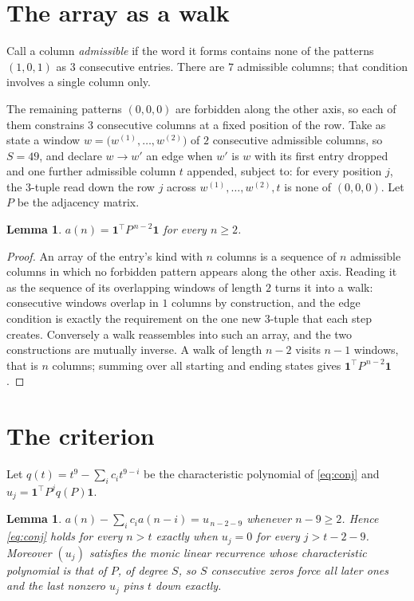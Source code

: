 \documentclass[11pt,a4paper]{article}
\theoremstyle{plain}
\newtheorem{lemma}[theorem]{Lemma}
\theoremstyle{definition}
\begin{document}
\section{The array as a walk}

Call a column \emph{admissible} if the word it forms contains none of the patterns
$(1,0,1)$ as $3$ consecutive entries. There are $7$ admissible columns; that condition
involves a single column only.

The remaining patterns $(0,0,0)$ are forbidden along the other axis, so each of them
constrains $3$ consecutive columns at a fixed position of the row. Take as state a
window $w=\bigl(w^{(1)},\dots,w^{(2)}\bigr)$ of $2$ consecutive admissible
columns, so $S=49$, and declare $w\to w'$ an edge when $w'$ is $w$ with its first entry
dropped and one further admissible column $t$ appended, subject to: for every position
$j$, the $3$-tuple read down the row $j$ across $w^{(1)},\dots,w^{(2)},t$
is none of $(0,0,0)$. Let $P$ be the adjacency matrix.

\begin{lemma}\label{lem:walk}
$a(n)=\mathbf{1}^{\!\top}P^{\,n-2}\mathbf{1}$ for every $n\ge2$.
\end{lemma}

\begin{proof}
An array of the entry's kind with $n$ columns is a sequence of $n$ admissible columns in
which no forbidden pattern appears along the other axis. Reading it as the sequence of its
overlapping windows of length $2$ turns it into a walk: consecutive windows overlap in
$1$ columns by construction, and the edge condition is exactly the requirement on the one
new $3$-tuple that each step creates. Conversely a walk reassembles into such an array,
and the two constructions are mutually inverse. A walk of length $n-2$ visits $n-1$
windows, that is $n$ columns; summing over all starting and ending states gives
$\mathbf{1}^{\!\top}P^{\,n-2}\mathbf{1}$.
\end{proof}

\section{The criterion}

Let $q(t)=t^{9}-\sum_i c_i t^{9-i}$ be the characteristic polynomial of
\eqref{eq:conj} and $u_j=\mathbf{1}^{\!\top}P^{j}q(P)\mathbf{1}$.

\begin{lemma}\label{lem:crit}
$a(n)-\sum_i c_i a(n-i)=u_{\,n-2-9}$ whenever $n-9\ge2$. Hence
\eqref{eq:conj} holds for every $n>t$ exactly when $u_j=0$ for every
$j>t-2-9$. Moreover $(u_j)$ satisfies the monic linear recurrence whose
characteristic polynomial is that of $P$, of degree $S$, so $S$ consecutive zeros force all
later ones and the last nonzero $u_j$ pins $t$ down exactly.
\end{lemma}
\end{document}
